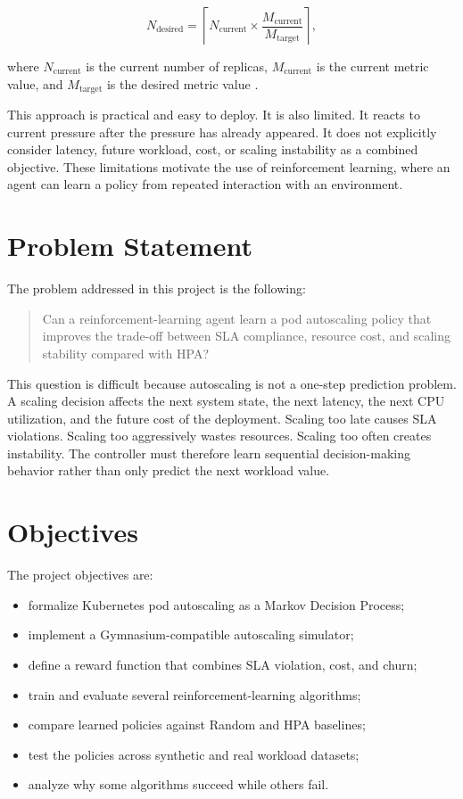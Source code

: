 \documentclass{rapportINPTCLOUD}
\begin{document}
\begin{equation}
N_{\text{desired}} =
\left\lceil
N_{\text{current}}
\times
\frac{M_{\text{current}}}{M_{\text{target}}}
\right\rceil ,
\label{eq:hpa}
\end{equation}

where $N_{\text{current}}$ is the current number of replicas, $M_{\text{current}}$ is the current metric value, and $M_{\text{target}}$ is the desired metric value \cite{kubernetesHPA}.

This approach is practical and easy to deploy. It is also limited. It reacts to current pressure after the pressure has already appeared. It does not explicitly consider latency, future workload, cost, or scaling instability as a combined objective. These limitations motivate the use of reinforcement learning, where an agent can learn a policy from repeated interaction with an environment.

\section{Problem Statement}

The problem addressed in this project is the following:

\begin{quote}
Can a reinforcement-learning agent learn a pod autoscaling policy that improves the trade-off between SLA compliance, resource cost, and scaling stability compared with HPA?
\end{quote}

This question is difficult because autoscaling is not a one-step prediction problem. A scaling decision affects the next system state, the next latency, the next CPU utilization, and the future cost of the deployment. Scaling too late causes SLA violations. Scaling too aggressively wastes resources. Scaling too often creates instability. The controller must therefore learn sequential decision-making behavior rather than only predict the next workload value.

\section{Objectives}

The project objectives are:

\begin{itemize}
  \item formalize Kubernetes pod autoscaling as a Markov Decision Process;
  \item implement a Gymnasium-compatible autoscaling simulator;
  \item define a reward function that combines SLA violation, cost, and churn;
  \item train and evaluate several reinforcement-learning algorithms;
  \item compare learned policies against Random and HPA baselines;
  \item test the policies across synthetic and real workload datasets;
  \item analyze why some algorithms succeed while others fail.
\end{itemize}
\end{document}
